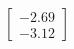 \documentclass[preview]{standalone}
\begin{document}
\begin{align*}
\begin{bmatrix} -2.69 \\ -3.12 \end{bmatrix}
\end{align*}
\end{document}
